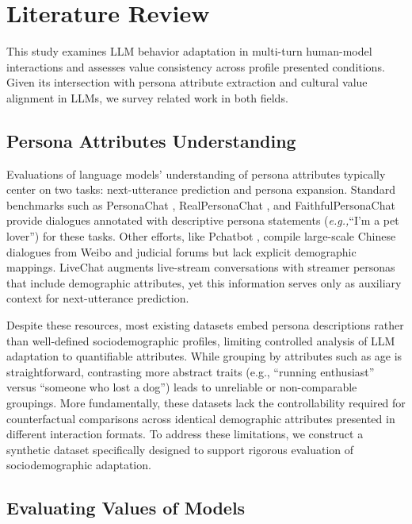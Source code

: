 \documentclass[acmlarge]{acmart}
\newcommand{\eg}{\textit{e.g.,}\xspace}
\begin{document}
\section{Literature Review}

This study examines LLM behavior adaptation in multi-turn human-model interactions and assesses value consistency across profile presented conditions. Given its intersection with persona attribute extraction and cultural value alignment in LLMs, we survey related work in both fields.

\subsection{Persona Attributes Understanding}

Evaluations of language models' understanding of persona attributes typically center on two tasks: next-utterance prediction and persona expansion. Standard benchmarks such as PersonaChat \citep{personachat}, RealPersonaChat \citep{realpersonachat}, and FaithfulPersonaChat \citep{faithfulPersonaChat} provide dialogues annotated with descriptive persona statements (\eg ``I'm a pet lover'') for these tasks. Other efforts, like Pchatbot \citep{pchatbot}, compile large-scale Chinese dialogues from Weibo and judicial forums but lack explicit demographic mappings. LiveChat \citep{gao-etal-2023-livechat} augments live-stream conversations with streamer personas that include demographic attributes, yet this information serves only as auxiliary context for next-utterance prediction.

Despite these resources, most existing datasets embed persona descriptions rather than well-defined sociodemographic profiles, limiting controlled analysis of LLM adaptation to quantifiable attributes. While grouping by attributes such as age is straightforward, contrasting more abstract traits (e.g., ``running enthusiast'' versus ``someone who lost a dog'') leads to unreliable or non-comparable groupings. More fundamentally, these datasets lack the controllability required for counterfactual comparisons across identical demographic attributes presented in different interaction formats. To address these limitations, we construct a synthetic dataset specifically designed to support rigorous evaluation of sociodemographic adaptation.



\subsection{Evaluating Values of Models}
\end{document}

